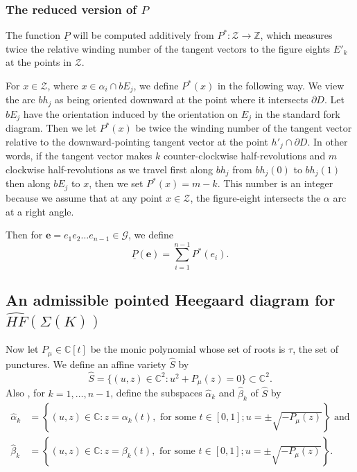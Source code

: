 \documentclass[11pt]{article}
\theoremstyle{plain} \newtheorem{thm}{Theorem}[subsection]
\theoremstyle{plain} \newtheorem{cor}[thm]{Corollary}
\theoremstyle{plain} \newtheorem{prop}[thm]{Proposition}
\theoremstyle{plain} \newtheorem{conj}[thm]{Conjecture}
\theoremstyle{plain} \newtheorem{lem}[thm]{Lemma}
\theoremstyle{definition} \newtheorem{df}[thm]{Definition}
\theoremstyle{remark} \newtheorem{rmk}[thm]{Remark}
\theoremstyle{remark} \newtheorem{obs}[thm]{Observation}
\newcommand{\DBC}[1]{\Sigma(#1)}
\newcommand{\Zcal}{\mathcal{Z}}
\newcommand{\G}{\mathcal{G}}
\newcommand{\red}[1]{\underline{#1}}
\newcommand{\ah}{\widehat{\alpha}}
\newcommand{\bh}{\widehat{\beta}}
\newcommand{\be}{\mathbf{e}}
\numberwithin{equation}{section}
\begin{document}
\subsubsection{The reduced version of $P$}\label{sec:Pdef}
 
The function $\red{P}$ will be computed additively from $P^{*} : \Zcal \rightarrow \mathbb{Z}$, which measures twice the relative winding number of the tangent vectors to the figure eights $E'_{k}$ at the points in $\Zcal$.
 
For $x \in \Zcal$, where $x \in \alpha_{i} \cap bE_{j}$, we define $ P^{*}(x)$ in the following way. We view the arc $bh_{j}$ as being oriented downward at the point where it intersects $\partial D$.  Let $bE_{j}$ have the orientation induced by the orientation on $E_{j}$ in the standard fork diagram.  Then we let $ P^{*}(x)$ be twice the winding number of the tangent vector relative to the downward-pointing tangent vector at the point $h'_{j} \cap \partial D$.  In other words, if the tangent vector makes $k$ counter-clockwise half-revolutions and $m$ clockwise half-revolutions as we travel first along $bh_{j}$ from $bh_{j} (0)$ to $bh_{j} (1)$ then along $bE_{j}$ to $x$, then we set $ P^{*}(x) = m-k$.  This number is an integer because we assume that at any point $x \in \Zcal$, the figure-eight intersects the $\alpha$ arc at a right angle.

Then for $\be = e_{1} e_{2} \ldots e_{n-1} \in \G$, we define
\begin{equation*}
\red{P}(\be) = \sum_{i = 1}^{n-1}   P^{*}(e_{i}).
\end{equation*}

\subsection{An admissible pointed Heegaard diagram for $\widehat{HF}(\DBC{K})$}\label{sec:redHD}

Now let $P_{\mu} \in \mathbb{C}[t]$ be the monic polynomial whose set of roots is $\tau$, the set of punctures.  We define an affine variety $\widehat{S}$ by
\begin{equation*}
\widehat{S} = \{ (u, z) \in \mathbb{C}^{2} : u^{2} + P_{\mu}(z) = 0 \} \subset \mathbb{C}^{2}.
\end{equation*}
Also , for $k = 1, \ldots , n-1$, define the subspaces $\ah_{k}$ and $\bh_{k}$ of $\widehat{S}$ by
\begin{align*}
\ah_{k} &= \left\{ (u,z) \in \mathbb{C} : z = \alpha_{k}(t),\text{ for some } t\in [0,1]; u = \pm \sqrt{-P_{\mu}(z)} \right\} \text{ and}\\
\bh_{k} &= \left\{ (u,z) \in \mathbb{C} : z = \beta_{k}(t),\text{ for some } t\in [0,1]; u = \pm \sqrt{-P_{\mu}(z)} \right\}.
\end{align*}
\end{document}
